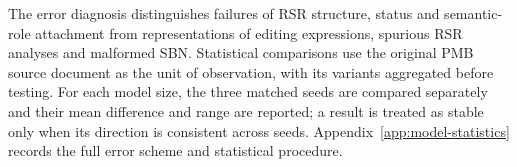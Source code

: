 The error diagnosis distinguishes failures of RSR structure, status and
semantic-role attachment from representations of editing expressions, spurious
RSR analyses and malformed SBN. Statistical comparisons use the original PMB
source document as the unit of observation, with its variants aggregated
before testing. For each model size, the three matched seeds are compared
separately and their mean difference and range are reported; a result is
treated as stable only when its direction is consistent across seeds.
Appendix~\ref{app:model-statistics} records the full error scheme and
statistical procedure.